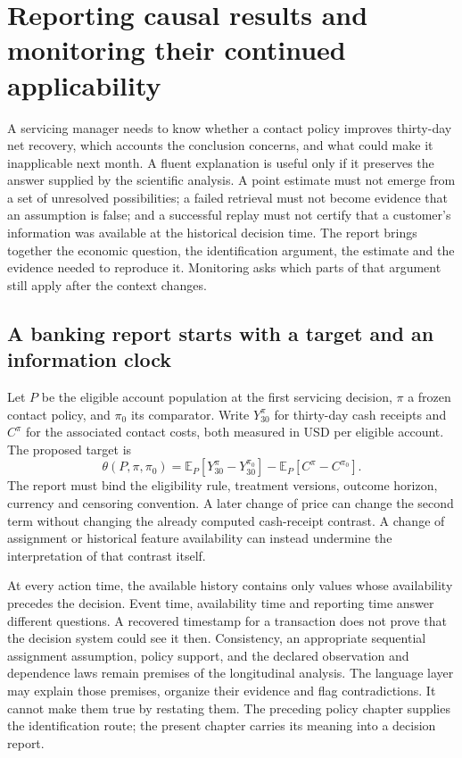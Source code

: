 \chapter{Reporting causal results and monitoring their continued applicability}
\label{exec16:reporting}

A servicing manager needs to know whether a contact policy improves thirty-day
net recovery, which accounts the conclusion concerns, and what could make it
inapplicable next month. A fluent explanation is useful only if it preserves the
answer supplied by the scientific analysis. A point estimate must not emerge
from a set of unresolved possibilities; a failed retrieval must not become
evidence that an assumption is false; and a successful replay must not certify
that a customer's information was available at the historical decision time.
The report brings together the economic question, the identification
argument, the estimate and the evidence needed to reproduce it. Monitoring asks which parts of that argument still apply after the
context changes.

\section{A banking report starts with a target and an information clock}

Let \(P\) be the eligible account population at the first servicing decision,
\(\pi\) a frozen contact policy, and \(\pi_0\) its comparator. Write
\(Y_{30}^{\pi}\) for thirty-day cash receipts and \(C^\pi\) for the associated
contact costs, both measured in USD per eligible account. The proposed target is
\[
 \theta(P,\pi,\pi_0)
   =\mathbb E_P[Y_{30}^{\pi}-Y_{30}^{\pi_0}]
     -\mathbb E_P[C^\pi-C^{\pi_0}].
\]
The report must bind the eligibility rule, treatment versions, outcome horizon,
currency and censoring convention. A later change of price can change the second
term without changing the already computed cash-receipt contrast. A change of
assignment or historical feature availability can instead undermine the
interpretation of that contrast itself.

At every action time, the available history contains only values whose
availability precedes the decision. Event time, availability time and reporting
time answer different questions. A recovered timestamp for a transaction does
not prove that the decision system could see it then. Consistency, an
appropriate sequential assignment assumption, policy support, and the declared
observation and dependence laws remain premises of the longitudinal analysis.
The language layer may explain those premises, organize their evidence and flag
contradictions. It cannot make them true by restating them. The preceding policy
chapter supplies the identification route; the present chapter carries its
meaning into a decision report.

